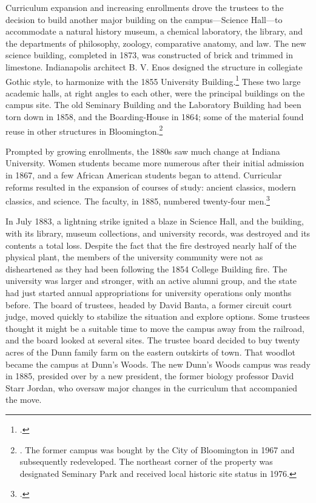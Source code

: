 \documentclass[
  american,
  letterpaper,
]{scrreprt}
\begin{document}
Curriculum expansion and increasing enrollments drove the trustees to
the decision to build another major building on the campus---Science
Hall---to accommodate a natural history museum, a chemical laboratory,
the library, and the departments of philosophy, zoology, comparative
anatomy, and law. The new science building, completed in 1873, was
constructed of brick and trimmed in limestone. Indianapolis architect B.
V. Enos designed the structure in collegiate Gothic style, to harmonize
with the 1855 University Building.\footnote{.} These two large academic halls, at right angles to each
other, were the principal buildings on the campus site. The old Seminary
Building and the Laboratory Building had been torn down in 1858, and the
Boarding-House in 1864; some of the material found reuse in other
structures in Bloomington.\footnote{. The former campus was bought by the City of Bloomington in
  1967 and subsequently redeveloped. The northeast corner of the
  property was designated Seminary Park and received local historic site
  status in 1976.}

Prompted by growing enrollments, the 1880s saw much change at Indiana
University. Women students became more numerous after their initial
admission in 1867, and a few African American students began to attend.
Curricular reforms resulted in the expansion of courses of study:
ancient classics, modern classics, and science. The faculty, in 1885,
numbered twenty-four men.\footnote{.}

In July 1883, a lightning strike ignited a blaze in Science Hall, and
the building, with its library, museum collections, and university
records, was destroyed and its contents a total loss. Despite the fact
that the fire destroyed nearly half of the physical plant, the members
of the university community were not as disheartened as they had been
following the 1854 College Building fire. The university was larger and
stronger, with an active alumni group, and the state had just started
annual appropriations for university operations only months before. The
board of trustees, headed by David Banta, a former circuit court judge,
moved quickly to stabilize the situation and explore options. Some
trustees thought it might be a suitable time to move the campus away
from the railroad, and the board looked at several sites. The trustee
board decided to buy twenty acres of the Dunn family farm on the eastern
outskirts of town. That woodlot became the campus at Dunn's Woods. The
new Dunn's Woods campus was ready in 1885, presided over by a new
president, the former biology professor David Starr Jordan, who oversaw
major changes in the curriculum that accompanied the move.
\end{document}
